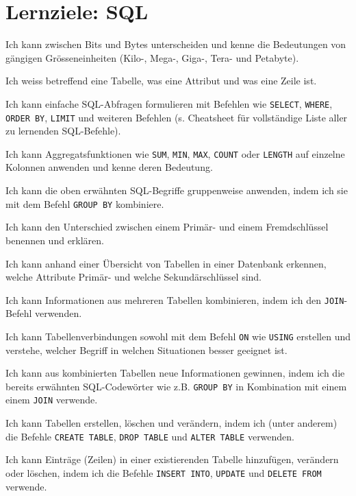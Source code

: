 \section*{Lernziele: SQL}
\begin{todolist}
\item Ich kann zwischen Bits und Bytes unterscheiden und kenne die Bedeutungen von gängigen Grösseneinheiten (Kilo-, Mega-, Giga-, Tera- und Petabyte).
\item Ich weiss betreffend eine Tabelle, was eine Attribut und was eine Zeile ist.
\item Ich kann einfache SQL-Abfragen formulieren mit Befehlen wie \lstinline|SELECT|, \lstinline|WHERE|,  \lstinline|ORDER BY|, \lstinline|LIMIT| und weiteren Befehlen (s. Cheatsheet für vollständige Liste aller zu lernenden SQL-Befehle).
\item Ich kann Aggregatsfunktionen wie \lstinline|SUM|, \lstinline|MIN|, \lstinline|MAX|, \lstinline|COUNT| oder \lstinline|LENGTH| auf einzelne Kolonnen anwenden und kenne deren Bedeutung.
\item Ich kann die oben erwähnten SQL-Begriffe gruppenweise anwenden, indem ich sie mit dem Befehl \lstinline|GROUP BY| kombiniere.
\item Ich kann den Unterschied zwischen einem Primär- und einem Fremdschlüssel benennen und erklären.
\item Ich kann anhand einer Übersicht von Tabellen in einer Datenbank erkennen, welche Attribute Primär- und welche Sekundärschlüssel sind.
\item Ich kann Informationen aus mehreren Tabellen kombinieren, indem ich den \lstinline|JOIN|-Befehl verwenden.
\item Ich kann Tabellenverbindungen sowohl mit dem Befehl \lstinline|ON| wie \lstinline|USING| erstellen und verstehe, welcher Begriff in welchen Situationen besser geeignet ist.
\item Ich kann aus kombinierten Tabellen neue Informationen gewinnen, indem ich die bereits erwähnten SQL-Codewörter wie z.B. \lstinline|GROUP BY| in Kombination mit einem einem \lstinline|JOIN| verwende.
\item Ich kann Tabellen erstellen, löschen und verändern, indem ich (unter anderem) die Befehle \lstinline|CREATE TABLE|, \lstinline|DROP TABLE| und \lstinline|ALTER TABLE| verwenden.
\item Ich kann Einträge (Zeilen) in einer existierenden Tabelle hinzufügen, verändern oder löschen, indem ich die Befehle \lstinline|INSERT INTO|, \lstinline|UPDATE| und \lstinline|DELETE FROM| verwende.
\end{todolist}